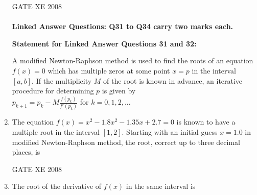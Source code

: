 \documentclass[12pt]{article}
\begin{document}
\begin{enumerate}
\begin{enumerate}
\end{enumerate}

GATE XE 2008
\\
\\
\noindent \textbf{\large Linked Answer Questions: Q31 to Q34 carry two marks each.}

\textbf{Statement for Linked Answer Questions 31 and 32:}

A modified Newton-Raphson method is used to find the roots of an equation $f(x)= 0$ which has multiple zeros at some point $x = p$ in the interval $[a,b]$. If the multiplicity $M$ of the root is known in advance, an iterative procedure for determining $p$ is given by \newline \\
$p_{k+1} = p_{k} - M\frac{f(p_{k})}{f'(p_{k})}$ for $k=0,1,2,...$
\\
\item  The equation $f(x)=x^2-1.8x^2 -1.35x+2.7= 0$ is known to have a multiple root in the
interval $[1,2]$. Starting with an initial guess $x =1.0$ in modified Newton-Raphson method, the root, correct up to three decimal places, is

\begin{enumerate}
\end{enumerate}

GATE XE 2008

\item The root of the derivative of $f(x)$ in the same interval is

\begin{enumerate}
\end{enumerate}


\end{enumerate}
\end{document}
